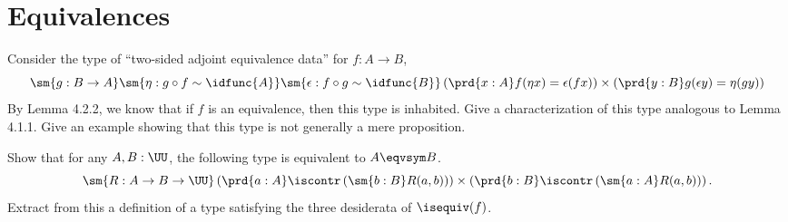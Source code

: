 \begin{coqdoccode}
\end{coqdoccode}
\section{Equivalences}



Consider the type of ``two-sided adjoint equivalence data'' for $f : A \to B$,
\[
  \sm{g:B \to A} 
  \sm{\eta : g \circ f \sim \idfunc{A}}
  \sm{\epsilon : f \circ g \sim \idfunc{B}}
  \left(\prd{x:A} f(\eta x) = \epsilon(f x)\right)
    \times
  \left(\prd{y:B} g(\epsilon y) = \eta(g y)\right)
\]
By Lemma 4.2.2, we know that if $f$ is an equivalence, then this type is
inhabited.  Give a characterization of this type analogous to Lemma 4.1.1.
Give an example showing that this type is not generally a mere proposition.


Show that for any $A, B : \UU$, the following type is equivalent to $A \eqvsym
B$.
\[
  \sm{R : A \to B \to \UU}
  \left(\prd{a:A} \iscontr \left(\sm{b:B} R(a, b)\right)\right)
  \times
  \left(\prd{b:B} \iscontr \left(\sm{a:A} R(a, b)\right)\right).
\]
Extract from this a definition of a type satisfying the three desiderata of
$\isequiv(f)$.


